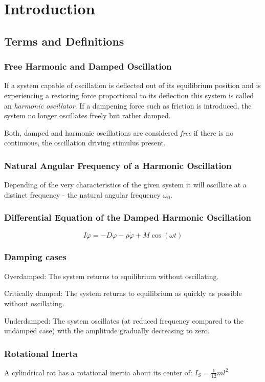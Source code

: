 \chapter{Introduction}
%
\section{Terms and Definitions}
    \subsection*{Free Harmonic and Damped Oscillation}
        If a system capable of oscillation is deflected out of its equilibrium position and is experiencing a restoring force
        proportional to its deflection this system is called an \textit{harmonic oscillator}. If a dampening force such as friction
        is introduced, the system no longer oscillates freely but rather damped.\par
        Both, damped and harmonic oscillations are considered \textit{free} if there is no continuous, the oscillation driving
        stimulus present.
    \subsection*{Natural Angular Frequency of a Harmonic Oscillation}
        Depending of the very characteristics of the given system it will oscillate at a distinct frequency - the natural angular
        frequency \( \omega_0 \).
    \subsection*{Differential Equation of the Damped Harmonic Oscillation}
        \begin{equation}
            I \ddot{\varphi} = -D\varphi -\rho\dot{\varphi}+M\cos(\omega t)
        \end{equation}
    \subsection*{Damping cases}
        Overdamped: The system returns to equilibrium without oscillating.\par
        Critically damped: The system returns to equilibrium as quickly as possible without oscillating.\par
        Underdamped: The system oscillates (at reduced frequency compared to the undamped case) with the amplitude gradually
        decreasing to zero.
    \subsection*{Rotational Inerta}
        A cylindrical rot has a rotational inertia about its center of: \(I_S = \frac{1}{12}ml^2\)
